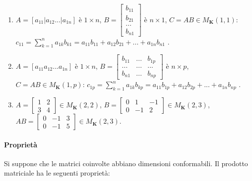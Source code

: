 \documentclass{article}
\begin{document}
\begin{enumerate}
\item $A=\left[ a_{11}|a_{12}...|a_{1n}\right] $ \`{e} $1\times n$, $B=\left[
\begin{array}{c}
b_{11} \\ 
b_{21} \\ 
... \\ 
b_{n1}%
\end{array}%
\right] $ \`{e} $n\times 1$, $C=AB\in M_{\mathbf{K}}\left( 1,1\right) $: $%
c_{11}=\sum_{k=1}^{n}a_{1k}b_{k1}=a_{11}b_{11}+a_{12}b_{21}+...+a_{1n}b_{n1}$%
.

\item $A=\left[ a_{11}a_{12}...a_{1n}\right] $ \`{e} $1\times n$, $B=\left[ 
\begin{array}{ccc}
b_{11} & ... & b_{1p} \\ 
... & ... & ... \\ 
b_{n1} & ... & b_{np}%
\end{array}%
\right] $ \`{e} $n\times p$, $C=AB\in M_{\mathbf{K}}\left( 1,p\right) $: $%
c_{1p}=\sum_{k=1}^{n}a_{1k}b_{kp}=a_{11}b_{1p}+a_{12}b_{2p}+...+a_{1n}b_{np}$%
.

\item $A=\left[ 
\begin{array}{cc}
1 & 2 \\ 
3 & 4%
\end{array}%
\right] \in M_{\mathbf{K}}\left( 2,2\right) $, $B=\left[ 
\begin{array}{ccc}
0 & 1 & -1 \\ 
0 & -1 & 2%
\end{array}%
\right] \in M_{\mathbf{K}}\left( 2,3\right) $, $AB=\left[ 
\begin{array}{ccc}
0 & -1 & 3 \\ 
0 & -1 & 5%
\end{array}%
\right] \in M_{\mathbf{K}}\left( 2,3\right) $.
\end{enumerate}

\paragraph{Propriet\`{a}}

Si suppone che le matrici coinvolte abbiano dimensioni conformabili. Il
prodotto matriciale ha le seguenti propriet\`{a}:
\end{document}
